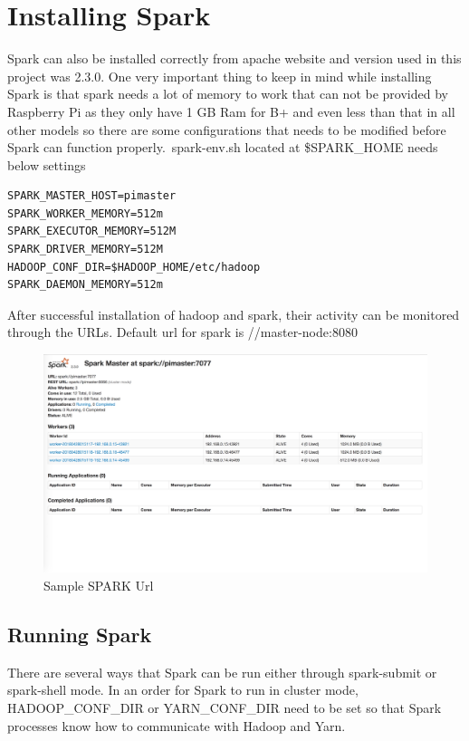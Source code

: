 \section{Installing Spark}

Spark can also be installed correctly from apache website and version
used in this project was 2.3.0. One very important thing to keep in
mind while installing Spark is that spark needs a lot of memory to
work that can not be provided by Raspberry Pi as they only have 1 GB
Ram for B+ and even less than that in all other models so there are
some configurations that needs to be modified before Spark can
function properly.~spark-env.sh located at \$SPARK\_HOME needs below
settings

\begin{verbatim}
SPARK_MASTER_HOST=pimaster
SPARK_WORKER_MEMORY=512m
SPARK_EXECUTOR_MEMORY=512M
SPARK_DRIVER_MEMORY=512M
HADOOP_CONF_DIR=$HADOOP_HOME/etc/hadoop
SPARK_DAEMON_MEMORY=512m
\end{verbatim}

After successful installation of hadoop and spark, their activity 
can be monitored through the URLs. Default url for spark is 
//master-node:8080

\begin{figure}[htbp] 
	\centering
	\includegraphics[width=\columnwidth]{images/sparkurl.jpg}
	\caption{Sample SPARK Url}
\label{fig:sparkurl} 
\end{figure}

\subsection{Running Spark}

There are several ways that Spark can be run either through
spark-submit or spark-shell mode. In an order for Spark to run in
cluster mode, HADOOP\_CONF\_DIR or YARN\_CONF\_DIR need to be set so
that Spark processes know how to communicate with Hadoop and Yarn.

